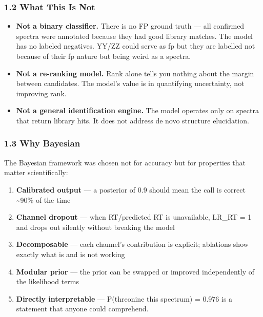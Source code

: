 \subsubsection{1.2 What This Is Not}\label{what-this-is-not}

\begin{itemize}
\tightlist
\item
  \textbf{Not a binary classifier.} There is no FP ground truth --- all
  confirmed spectra were annotated because they had good library
  matches. The model has no labeled negatives. YY/ZZ could serve as fp
  but they are labelled not because of their fp nature but being weird
  as a spectra.
\item
  \textbf{Not a re-ranking model.} Rank alone tells you nothing about
  the margin between candidates. The model's value is in quantifying
  uncertainty, not improving rank.
\item
  \textbf{Not a general identification engine.} The model operates only
  on spectra that return library hits. It does not address de novo
  structure elucidation.
\end{itemize}

\subsubsection{1.3 Why Bayesian}\label{why-bayesian}

The Bayesian framework was chosen not for accuracy but for properties
that matter scientifically:

\begin{enumerate}
\def\labelenumi{\arabic{enumi}.}
\tightlist
\item
  \textbf{Calibrated output} --- a posterior of 0.9 should mean the call
  is correct \textasciitilde90\% of the time
\item
  \textbf{Channel dropout} --- when RT/predicted RT is unavailable,
  LR\_RT = 1 and drops out silently without breaking the model
\item
  \textbf{Decomposable} --- each channel's contribution is explicit;
  ablations show exactly what is and is not working
\item
  \textbf{Modular prior} --- the prior can be swapped or improved
  independently of the likelihood terms
\item
  \textbf{Directly interpretable} --- P(threonine \textbar{} this
  spectrum) = 0.976 is a statement that anyone could comprehend.
\end{enumerate}

